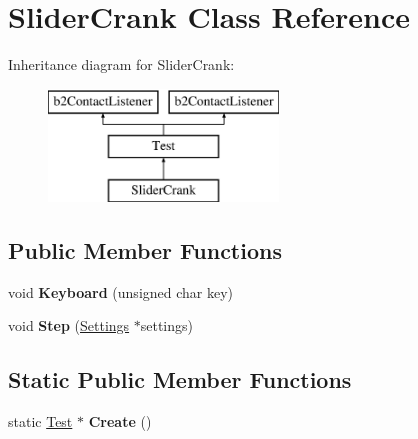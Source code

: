 \hypertarget{class_slider_crank}{\section{Slider\-Crank Class Reference}
\label{class_slider_crank}
}
Inheritance diagram for Slider\-Crank\-:\begin{figure}[H]
\begin{center}
\leavevmode
\includegraphics[height=3.000000cm]{class_slider_crank}
\end{center}
\end{figure}
\subsection*{Public Member Functions}
\begin{DoxyCompactItemize}
\item 
\hypertarget{class_slider_crank_adf883dd4aa872d25c6cb80790ee2f8cf}{void {\bfseries Keyboard} (unsigned char key)}\label{class_slider_crank_adf883dd4aa872d25c6cb80790ee2f8cf}

\item 
\hypertarget{class_slider_crank_a226edd34d1e052714240bf6c6e73a148}{void {\bfseries Step} (\hyperlink{struct_settings}{Settings} $\ast$settings)}\label{class_slider_crank_a226edd34d1e052714240bf6c6e73a148}

\end{DoxyCompactItemize}
\subsection*{Static Public Member Functions}
\begin{DoxyCompactItemize}
\item 
\hypertarget{class_slider_crank_ac2939eeb0948aa9f00a0b20d2c30bcd8}{static \hyperlink{class_test}{Test} $\ast$ {\bfseries Create} ()}\label{class_slider_crank_ac2939eeb0948aa9f00a0b20d2c30bcd8}

\end{DoxyCompactItemize}

